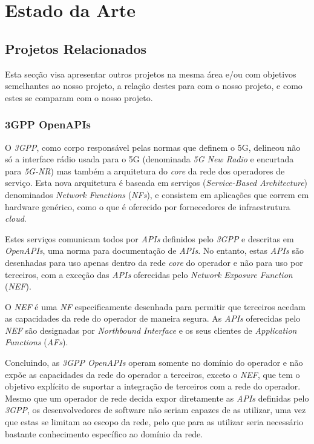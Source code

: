 \chapter{Estado da Arte}

\section{Projetos Relacionados}

Esta secção visa apresentar outros projetos na mesma área e/ou com objetivos
semelhantes ao nosso projeto, a relação destes para com o nosso projeto, e como
estes se comparam com o nosso projeto.

\subsection{3GPP OpenAPIs}\label{sec:related_work_3gpp}

O \emph{3GPP}, como corpo responsável pelas normas que definem o 5G, delineou
não só a interface rádio usada para o 5G (denominada \emph{5G New Radio} e
encurtada para \emph{5G-NR}) mas também a arquitetura do \emph{core} da rede
dos operadores de serviço. Esta nova arquitetura é baseada em serviços
(\emph{Service-Based Architecture}) denominados \emph{Network Functions}
(\emph{NFs}), e consistem em aplicações que correm em hardware genérico, como o
que é oferecido por fornecedores de infraestrutura \emph{cloud}.

Estes serviços comunicam todos por \emph{APIs} definidos pelo \emph{3GPP} e
descritas em \emph{OpenAPIs}, uma norma para documentação de \emph{APIs}. No
entanto, estas \emph{APIs} são desenhadas para uso apenas dentro da rede
\emph{core} do operador e não para uso por terceiros, com a exceção das
\emph{APIs} oferecidas pelo \emph{Network Exposure Function} (\emph{NEF}).

O \emph{NEF} é uma \emph{NF} especificamente desenhada para permitir que
terceiros acedam as capacidades da rede do operador de maneira segura. As
\emph{APIs} oferecidas pelo \emph{NEF} são designadas por \emph{Northbound
	Interface} e os seus clientes de \emph{Application Functions} (\emph{AFs}).


Concluindo, as \emph{3GPP OpenAPIs} operam somente no domínio do operador e não
expõe as capacidades da rede do operador a terceiros, exceto o \emph{NEF}, que
tem o objetivo explícito de suportar a integração de terceiros com a rede do
operador. Mesmo que um operador de rede decida expor diretamente as \emph{APIs}
definidas pelo \emph{3GPP}, os desenvolvedores de software não seriam capazes de
as utilizar, uma vez que estas se limitam ao escopo da rede, pelo que para as utilizar
seria necessário bastante conhecimento específico ao domínio da rede.

